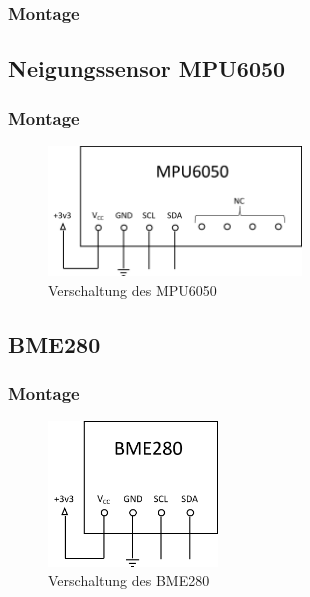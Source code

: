 \subsubsection{Montage}




\subsection{Neigungssensor MPU6050}


\subsubsection{Montage}

\begin{figure}[H]
  \centering
  \includegraphics[width=0.6\textwidth]{./img/MPU6050_Plan.png}
  \caption{Verschaltung des MPU6050}\label{fig:MPU6050_Plan}
\end{figure}

\subsection{BME280}


\subsubsection{Montage}


\begin{figure}[H]
  \centering
  \includegraphics[width=0.4\textwidth]{./img/BME280_Plan.png}
  \caption{Verschaltung des BME280}\label{fig:BME280_Plan}
\end{figure}

